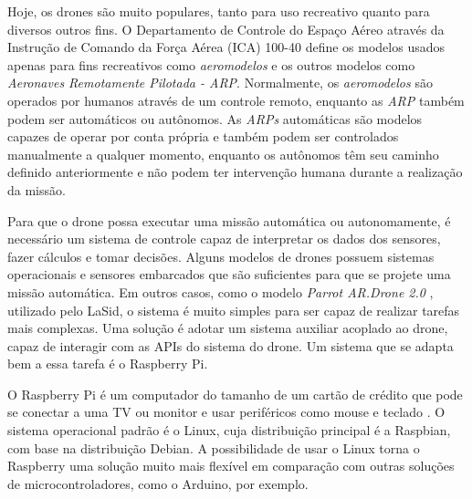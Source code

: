 

Hoje, os drones são muito populares, tanto para uso recreativo quanto para diversos outros fins. O Departamento de Controle do Espaço Aéreo através da Instrução de Comando da Força Aérea (ICA) 100-40 \cite{CEA2018} define os modelos usados apenas para fins recreativos como \textit{aeromodelos} e os outros modelos como \textit{Aeronaves Remotamente Pilotada - ARP}. Normalmente, os \textit{aeromodelos} são operados por humanos através de um controle remoto, enquanto as \textit{ARP} também podem ser automáticos ou autônomos. As \textit{ARPs} automáticas são modelos capazes de operar por conta própria e também podem ser controlados manualmente a qualquer momento, enquanto os autônomos têm seu caminho definido anteriormente e não podem ter intervenção humana durante a realização da missão.

Para que o drone possa executar uma missão automática ou autonomamente, é necessário um sistema de controle capaz de interpretar os dados dos sensores, fazer cálculos e tomar decisões. Alguns modelos de drones possuem sistemas operacionais e sensores embarcados que são suficientes para que se projete uma missão automática. Em outros casos, como o modelo \textit{Parrot AR.Drone 2.0} \cite{Parrot2019a}, utilizado pelo LaSid, o sistema é muito simples para ser capaz de realizar tarefas mais complexas. Uma solução é adotar um sistema auxiliar acoplado ao drone, capaz de interagir com as APIs do sistema do drone. Um sistema que se adapta bem a essa tarefa é o Raspberry Pi.

O Raspberry Pi é um computador do tamanho de um cartão de crédito que pode se conectar a uma TV ou monitor e usar periféricos como mouse e teclado \cite{RPF2019}. O sistema operacional padrão é o Linux, cuja distribuição principal é a Raspbian, com base na distribuição Debian. A possibilidade de usar o Linux torna o Raspberry uma solução muito mais flexível em comparação com outras soluções de microcontroladores, como o Arduino, por exemplo.


